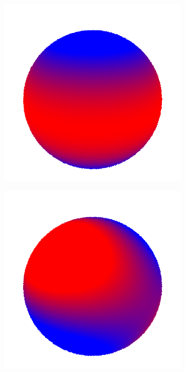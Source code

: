 \documentclass{article}
\begin{document}
\begin{figure}[!h]
\begin{subfigure}{.1\textwidth}
\end{subfigure}
\begin{subfigure}{.1\textwidth}
  \centering
  \includegraphics[width=\linewidth]{figs/spherical_harmonics/harmonics_6.png}  
\end{subfigure}
\begin{subfigure}{.1\textwidth}
  \centering
  \includegraphics[width=\linewidth]{figs/spherical_harmonics/harmonics_7.png}  

\end{subfigure}
\end{figure}
\end{document}
